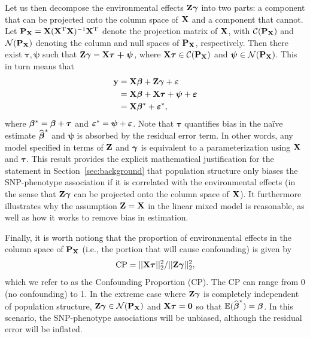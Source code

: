 Let us then decompose the environmental effects $\mathbf{Z} \boldsymbol{\gamma}$ into two parts: a component that can be projected onto the column space of $\mathbf{X}$ and a component that cannot. Let $\mathbf{P}_{\mathbf{X}} = \mathbf{X} (\mathbf{X}^{\text{T}} \mathbf{X})^{-1} \mathbf{X}^{\text{T}}$ denote the projection matrix of $\mathbf{X}$, with $\mathcal{C}(\mathbf{P}_{\mathbf{X}})$ and $\mathcal{N}(\mathbf{P}_{\mathbf{X}})$ denoting the column and null spaces of $\mathbf{P}_{\mathbf{X}}$, respectively. Then there exist $\boldsymbol{\tau}, \boldsymbol{\psi}$ such that $\mathbf{Z} \boldsymbol{\gamma} = \mathbf{X} \boldsymbol{\tau + \psi}$, where $\mathbf{X} \boldsymbol{\tau} \in \mathcal{C}(\mathbf{P}_{\mathbf{X}})$ and $\boldsymbol{\psi} \in \mathcal{N}(\mathbf{P}_{\mathbf{X}})$.  This in turn means that
\begin{equation}
  \begin{aligned}
    \label{eqn:partition_e}
    \mathbf{y} &= \mathbf{X}\boldsymbol{\beta}{} + \mathbf{Z}\boldsymbol{\gamma} + \boldsymbol{\varepsilon}{} \\
    &= \mathbf{X}\boldsymbol{\beta}{} + \mathbf{X} \boldsymbol{\tau} + \boldsymbol{\psi} + \boldsymbol{\varepsilon}{} \\
    &=  \mathbf{X} \boldsymbol{\beta}{}{^*} + \boldsymbol{\varepsilon}{}{^*},
  \end{aligned}
\end{equation}
where $\boldsymbol{\beta}{}^* = \boldsymbol{\beta}{} + \boldsymbol{\tau}$ and $\boldsymbol{\varepsilon}{}{^*} = \boldsymbol{\psi} + \boldsymbol{\varepsilon}{}$.  Note that $\boldsymbol{\tau}$ quantifies bias in the na\"ive estimate $\widehat{\boldsymbol{\beta}{}}^*$ and $\boldsymbol{\psi}$ is absorbed by the residual error term. In other words, any model specified in terms of $\mathbf{Z}$ and $\boldsymbol{\gamma}$ is equivalent to a parameterization using $\mathbf{X}$ and $\boldsymbol{\tau}$.  This result provides the explicit mathematical justification for the statement in Section~\ref{sec:background} that population structure only biases the SNP-phenotype association if it is correlated with the environmental effects (in the sense that $\mathbf{Z}\boldsymbol{\gamma}$ can be projected onto the column space of $\mathbf{X}$). It furthermore illustrates why the assumption $\mathbf{Z}=\mathbf{X}$ in the linear mixed model is reasonable, as well as how it works to remove bias in estimation.

Finally, it is worth notiong that the proportion of environmental effects in the column space of $\mathbf{P}_{\mathbf{X}}$ (i.e., the portion that will cause confounding) is given by
\begin{equation}
    \label{eqn:ratio}
    \text{CP} = ||\mathbf{X} \boldsymbol{\tau}||_2^2 / ||\mathbf{Z} \boldsymbol{\gamma}||_2^2,
\end{equation}
which we refer to as the Confounding Proportion (CP). The CP can range from 0 (no confounding) to 1. In the extreme case where $\mathbf{Z} \boldsymbol{\gamma}$ is completely independent of population structure, $\mathbf{Z} \boldsymbol{\gamma} \in \mathcal{N}(\mathbf{P}_{\mathbf{X}})$ and $\mathbf{X} \boldsymbol{\tau} = \boldsymbol{0}$ so that $\mathbb{E}(\widehat{\boldsymbol{\beta}{}}^*) = \boldsymbol{\beta}{}$. In this scenario, the SNP-phenotype associations will be unbiased, although the residual error will be inflated. 

